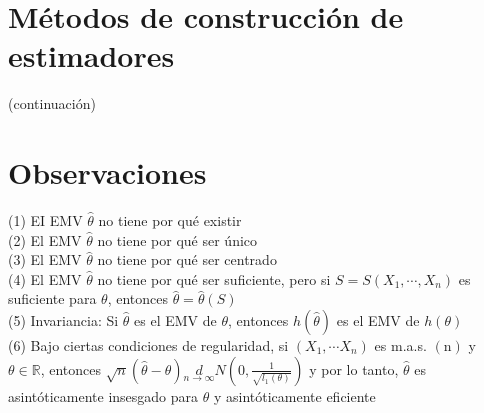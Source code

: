 \section*{Métodos de construcción de estimadores}
(continuación)

\section*{Observaciones}
(1) EI EMV $\hat{\theta}$ no tiene por qué existir\\
(2) El EMV $\hat{\theta}$ no tiene por qué ser único\\
(3) El EMV $\hat{\theta}$ no tiene por qué ser centrado\\
(4) El EMV $\hat{\theta}$ no tiene por qué ser suficiente, pero si $S=S\left(X_{1}, \cdots, X_{n}\right)$ es suficiente para $\theta$, entonces $\hat{\theta}=\hat{\theta}(S)$\\
(5) Invariancia: Si $\hat{\theta}$ es el EMV de $\theta$, entonces $h(\hat{\theta})$ es el EMV de $h(\theta)$\\
(6) Bajo ciertas condiciones de regularidad, si $\left(X_{1}, \cdots X_{n}\right)$ es m.a.s. $(\mathrm{n})$ y $\theta \in \mathbb{R}$, entonces $\sqrt{n}(\hat{\theta}-\theta) \underset{n \rightarrow \infty}{d} N\left(0, \frac{1}{\sqrt{l_{1}(\theta)}}\right)$ y por lo tanto, $\hat{\theta}$ es asintóticamente insesgado para $\theta$ y asintóticamente eficiente